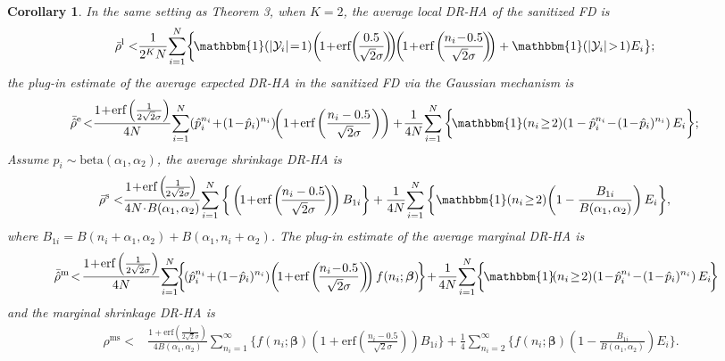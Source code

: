 \documentclass[10pt,journal,compsoc]{IEEEtran}
\newtheorem{cor}[thm]{\vspace{-6pt}\\ Corollary}
\newcommand{\bs}{\boldsymbol}
\begin{document}
\begin{cor}\label{cor:rho.gau}
In the same setting as Theorem 3, when $K=2$, the average local DR-HA  of the sanitized FD is \vspace{-4pt}
\begin{align}
\bar{\rho}^{\text{l}}<&\frac{1}{2^KN}\!\sum_{i=1}^N\!\bigg\{\! 
\mathbbm{1}(|\mathcal{Y}_i|\!=\!1)\!\left(\!1\!+\!\mbox{erf}\!\left(\!\frac{0.5}{\sqrt{2}\sigma}\!\right)\!\!\right)\!\!\left(\!1\!+\!\mbox{erf}\left(\!\frac{n_i\!-\!0.5}{\sqrt{2}\sigma}\!\right)\!\!\right)+\mathbbm{1}(|\mathcal{Y}_i|\!>\!1)E_i\big\};\label{eqn:averagel.gau.MC}
\end{align}
the plug-in estimate of the average expected DR-HA in the sanitized FD via the Gaussian mechanism is
\begin{align}
\bar{\hat{\rho}}^{\text{e}}\!<&\frac{1\!+\!\mbox{erf}\left(\frac{1}{2\sqrt{2}\sigma}\right)}{4N}\!\sum_{i=1}^N\!\left(\hat{p}_i^{n_i}\!+\!(1\!-\!\hat{p}_i)^{n_i}\right)\!\!\left(1\!+\!\mbox{erf}\left(\frac{n_i-0.5}{\sqrt{2}\sigma}\right)\right)+\!\frac{1}{4N}\!\sum_{i=1}^N\bigg\{
\!\mathbbm{1}(n_i\!\ge\!2)\!\left(1-\hat{p}_i^{n_i}\!-\!(1\!-\!\hat{p}_i)^{n_i}\right)E_i\bigg\};\label{eqn:averagee.gau.MC}
\end{align}
Assume $p_i\!\sim\!\mbox{beta}(\alpha_1,\alpha_2)$, the average shrinkage DR-HA is
\begin{align}
\bar\rho^{\text{s}}<&\frac{\!1\!+\!\mbox{erf}\left(\!\frac{1}{2\sqrt{2}\sigma}\!\right)}{4N\!\cdot\! B(\alpha_1,\alpha_2)}\!\sum_{i=1}^N\bigg\{\left(\!1\!+\!\mbox{erf}\left(\!\frac{n_i-0.5}{\sqrt{2}\sigma}\!\right)\!\right)B_{1i}\bigg\}+\frac{1}{4N}\!\sum_{i=1}^{N}\bigg\{\mathbbm{1}(n_i\!\ge\!2)\!\left(1-\frac{B_{1i}}{B(\alpha_1,\alpha_2)}\right)E_i\bigg\}\label{eqn:averages.gau.MC} ,
\end{align}
where $B_{1i}=B(n_i+\alpha_1,\alpha_2)\!+\!B(\alpha_1,n_i+\alpha_2)$. The plug-in estimate of the average marginal DR-HA is
\begin{align}
&\bar{\hat{\rho}}^{\text{m}}\!<\!\frac{1\!+\!\mbox{erf}\left(\frac{1}{2\sqrt{2}\sigma}\right)}{4N}\!\sum_{i=1}^N\!\!\bigg\{\!\!\left(\hat{p}_i^{n_i}\!+\!(1\!-\!\hat{p}_i)^{n_i}\right)\!\left(\!1\!+\!\mbox{erf} \left(\!\frac{n_i\!-\!0.5}{\sqrt{2}\sigma}\right)\!\!\right)f(n_i;\bs{\beta})\!\bigg\}\!+\!\frac{1}{4N}\!\sum_{i=1}^N\!\bigg\{\!\mathbbm{1}\!(n_i\!\ge\!2)\!\left(1\!-\!\hat{p}_i^{n_i}\!-\!(1\!-\!\hat{p}_i)^{n_i}\right)E_i\!\bigg\}\!\!\label{eqn:averagem.gau.MC}
\end{align}
and the marginal shrinkage DR-HA is
\begin{align}
\rho^{\text{ms}}\!<&\frac{\!1\!+\!\mbox{erf}\!\left(\!\frac{1}{2\sqrt{2}\sigma}\!\right)\!}{4B(\alpha_1,\alpha_2)}\!\sum_{n_i=1}^{\infty}\!\!\bigg\{\!f(n_i;\bs{\beta})\!\left(\!1\!+\!\mbox{erf}\!\left(\frac{n_i\!-\!0.5}{\sqrt{2}\sigma}\!\right)\!\!\right)\!B_{1i}\!\bigg\}\!+\!\frac{1}{4}\!\sum_{n_i=2}^{\infty}\bigg\{f(n_i;\bs{\beta})
\!\left(1-\frac{B_{1i}}{B(\alpha_1,\alpha_2)}\right)E_i\bigg\}.\label{eqn:averagems.gau.2}
\end{align}
\end{cor}
\end{document}
